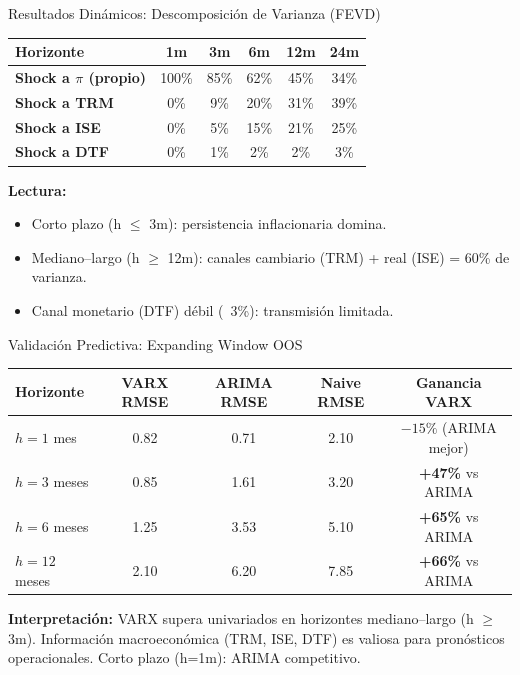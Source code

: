 \documentclass[aspectratio=169, 11pt]{beamer}
\begin{document}
\begin{frame}{Resultados Dinámicos: Descomposición de Varianza (FEVD)}
\small
\vspace{0.2cm}

\begin{tabular}{lccccc}
\toprule
\textbf{Horizonte} & \textbf{1m} & \textbf{3m} & \textbf{6m} & \textbf{12m} & \textbf{24m} \\
\midrule
\textbf{Shock a $\pi$ (propio)} & 100\% & 85\% & 62\% & 45\% & 34\% \\
\textbf{Shock a TRM} & 0\% & 9\% & 20\% & 31\% & 39\% \\
\textbf{Shock a ISE} & 0\% & 5\% & 15\% & 21\% & 25\% \\
\textbf{Shock a DTF} & 0\% & 1\% & 2\% & 2\% & 3\% \\
\bottomrule
\end{tabular}

\vspace{0.25cm}
\normalsize
\textbf{Lectura:}
\begin{itemize}
  \item Corto plazo (h $\leq$ 3m): persistencia inflacionaria domina.
  \item Mediano–largo (h $\geq$ 12m): canales cambiario (TRM) + real (ISE) = 60\% de varianza.
  \item Canal monetario (DTF) débil (~3\%): transmisión limitada.
\end{itemize}
\end{frame}

\begin{frame}{Validación Predictiva: Expanding Window OOS}
\small
\vspace{0.2cm}

\begin{tabular}{lcccc}
\toprule
\textbf{Horizonte} & \textbf{VARX RMSE} & \textbf{ARIMA RMSE} & \textbf{Naive RMSE} & \textbf{Ganancia VARX} \\
\midrule
$h = 1$ mes & 0.82 & 0.71 & 2.10 & $-15\%$ (ARIMA mejor) \\
$h = 3$ meses & 0.85 & 1.61 & 3.20 & \textbf{+47\%} vs ARIMA \\
$h = 6$ meses & 1.25 & 3.53 & 5.10 & \textbf{+65\%} vs ARIMA \\
$h = 12$ meses & 2.10 & 6.20 & 7.85 & \textbf{+66\%} vs ARIMA \\
\bottomrule
\end{tabular}

\vspace{0.2cm}
\normalsize
\textbf{Interpretación:} VARX supera univariados en horizontes mediano–largo (h $\geq$ 3m). Información macroeconómica (TRM, ISE, DTF) es valiosa para pronósticos operacionales. Corto plazo (h=1m): ARIMA competitivo.
\end{frame}
\end{document}
